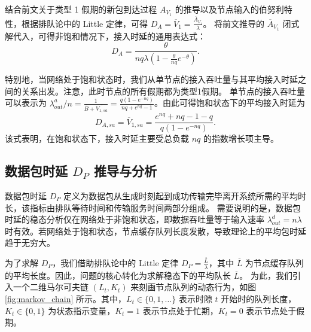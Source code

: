结合前文关于类型 1 假期的新包到达过程 $A_{V_1}$ 的推导以及节点输入的伯努利特性，根据排队论中的 Little 定律，可得 $D_A = \overline{V}_1 = \frac{\overline{A}_{V_1}}{\lambda}$。
将前文推导的 $\overline{A}_{V_1}$ 闭式解代入，可得非饱和情况下，接入时延的通用表达式：
\begin{equation}
	\label{eq:access_delay_general}
	D_A = \frac{\theta}{n q \lambda \left(1 - \frac{\theta}{n q} e^{-\theta}\right)}.
\end{equation}

特别地，当网络处于饱和状态时，我们从单节点的接入吞吐量与其平均接入时延之间的关系出发。注意，此时节点的所有假期都为类型1假期。
单节点的接入吞吐量可以表示为 $\lambda_{out}^a / n = \frac{1}{\overline{ B }+ \overline{V_{1,sa}}}= \frac{q(1 - e^{-nq})}{nq+e^{nq}-1}$。由此可得饱和状态下的平均接入时延为
\begin{equation}
	\label{eq:access_delay_sa}
	D_{A,sa} = \overline{V}_{1,sa} = \frac{e^{nq} + nq - 1 - q}{q(1 - e^{-nq})}.
\end{equation}
该式表明，在饱和状态下，接入时延主要受总负载 $nq$ 的指数增长项主导。


\subsection{数据包时延 $D_P$ 推导与分析}
数据包时延 $D_P$ 定义为数据包从生成时刻起到成功传输完毕离开系统所需的平均时长，该指标由排队等待时间和传输服务时间两部分组成。
需要说明的是，数据包时延的稳态分析仅在网络处于非饱和状态，即数据吞吐量等于输入速率 $\lambda_{out}^d = n\lambda$ 时有效。若网络处于饱和状态，节点缓存队列长度发散，导致理论上的平均包时延趋于无穷大。

为了求解 $D_P$，我们借助排队论中的 Little 定律 $D_P = \frac{\overline{L}}{\lambda}$，其中 $\overline{L}$ 为节点缓存队列的平均长度。因此，问题的核心转化为求解稳态下的平均队长 $\overline{L}$。
为此，我们引入一个二维马尔可夫链 $(L_t, K_t)$ 来刻画节点队列的动态行为，如图 \ref{fig:markov_chain} 所示。其中，$L_t \in \{0, 1, \dots\}$ 表示时隙 $t$ 开始时的队列长度，$K_t \in \{0, 1\}$ 为状态指示变量，$K_t=1$ 表示节点处于忙期，$K_t=0$ 表示节点处于假期。

